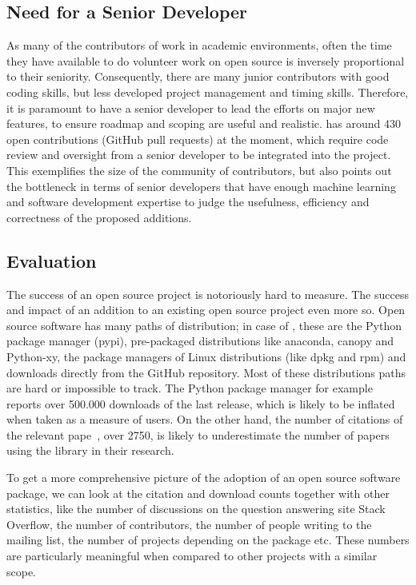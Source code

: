 \subsection{Need for a Senior Developer}
As many of the contributors of \sklearn{} work in academic environments,
often the time they have available to do volunteer work on open source is
inversely proportional to their seniority.
Consequently, there are many junior contributors with good coding skills,
but less developed project management and timing skills.
Therefore, it is paramount to have a senior developer to lead the efforts
on major new features, to ensure roadmap and scoping are useful and realistic.
\sklearn{} has around 430 open contributions (GitHub pull requests) at the moment,
which require code review and oversight from a senior developer to be integrated
into the project. This exemplifies the size of the community of contributors,
but also points out the bottleneck in terms of senior developers that
have enough machine learning and software development expertise to judge
the usefulness, efficiency and correctness of the proposed additions.


\subsection{Evaluation}
The success of an open source project is notoriously hard to measure. The
success and impact of an addition to an existing open source project even more
so. Open source software has many paths of distribution; in case of \sklearn{},
these are the Python package manager (pypi), pre-packaged distributions like
anaconda, canopy and Python-xy, the package managers of Linux distributions (like dpkg and rpm)
and downloads directly from the GitHub repository. Most of these distributions paths are hard
or impossible to track. The Python package manager for example reports over 500.000 downloads of the last
release, which is likely to be inflated when taken as a measure of users.
On the other hand, the number of citations of the relevant
pape~\autocite{pedregosa2011scikit}, over 2750, is likely to underestimate
the number of papers using the \sklearn{} library in their research.

To get a more comprehensive picture of the adoption of an open source software
package, we can look at the citation and download counts together with other
statistics, like the number of discussions on the question answering site
Stack Overflow, the number of contributors, the number of people writing to the
mailing list, the number of projects depending on the package etc.  These
numbers are particularly meaningful when compared to other projects with a
similar scope.


